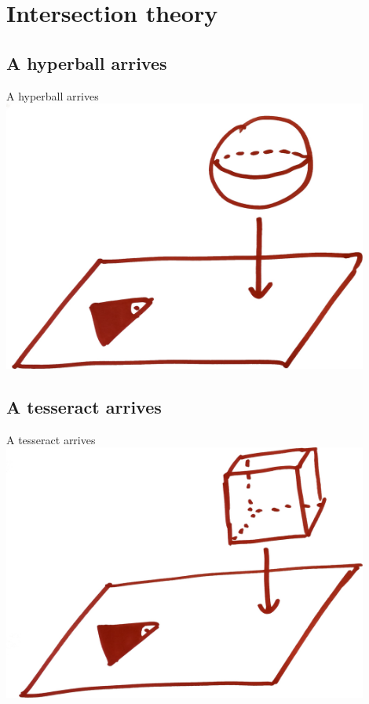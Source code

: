 \documentclass[12pt,compress,ngerman,utf8,t]{beamer}
\begin{document}


\section[Intersection]{Intersection theory}

\subsection{A hyperball arrives}

\begin{frame}{A hyperball arrives}
  \centering
  \includegraphics[width=0.9\textwidth]{a-hyperball-arrives}
  \par
\end{frame}


\subsection{A tesseract arrives}

\begin{frame}{A tesseract arrives}
  \centering
  \includegraphics[width=0.9\textwidth]{a-tesseract-arrives}
  \par
\end{frame}
\end{document}
